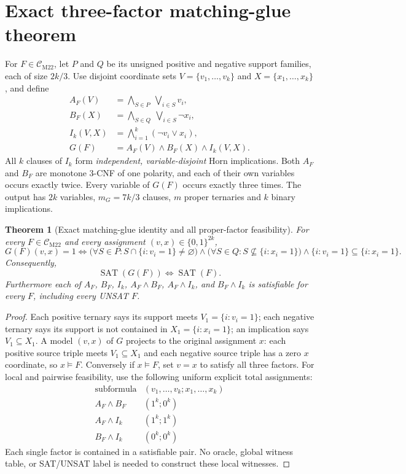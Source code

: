 \documentclass[11pt]{article}
\newtheorem{theorem}{Theorem}
\newcommand{\CM}{\mathcal C_{\mathrm{M22}}}
\newcommand{\SAT}{\operatorname{SAT}}
\begin{document}
\section{Exact three-factor matching-glue theorem}
For $F\in\CM$, let $P$ and $Q$ be its unsigned positive and negative support families, each of size $2k/3$. Use disjoint coordinate sets $V=\{v_1,\ldots,v_k\}$ and $X=\{x_1,\ldots,x_k\}$, and define
\[
\begin{aligned}
A_F(V)&=\bigwedge_{S\in P}\ \bigvee_{i\in S}v_i,\\
B_F(X)&=\bigwedge_{S\in Q}\ \bigvee_{i\in S}\neg x_i,\\
I_k(V,X)&=\bigwedge_{i=1}^k(\neg v_i\vee x_i),\\
G(F)&=A_F(V)\wedge B_F(X)\wedge I_k(V,X).
\end{aligned}
\]
All $k$ clauses of $I_k$ form \emph{independent, variable-disjoint} Horn implications. Both $A_F$ and $B_F$ are monotone 3-CNF of one polarity, and each of their own variables occurs exactly twice. Every variable of $G(F)$ occurs exactly three times. The output has $2k$ variables, $m_G=7k/3$ clauses, $m$ proper ternaries and $k$ binary implications.

\begin{theorem}[Exact matching-glue identity and all proper-factor feasibility]
For \emph{every} $F\in\CM$ and every assignment $(v,x)\in\{0,1\}^{2k}$,
\[
G(F)(v,x)=1\iff
 \bigl(\forall S\in P:S\cap\{i:v_i=1\}\ne\varnothing\bigr)
 \land
 \bigl(\forall S\in Q:S\nsubseteq\{i:x_i=1\}\bigr)
 \land
 \{i:v_i=1\}\subseteq\{i:x_i=1\}.
\]
Consequently,
\[
\boxed{\SAT(G(F))\iff\SAT(F).}
\]
Furthermore each of $A_F$, $B_F$, $I_k$, $A_F\wedge B_F$, $A_F\wedge I_k$, and $B_F\wedge I_k$ is satisfiable for \emph{every} $F$, including every UNSAT $F$.
\end{theorem}
\begin{proof}
Each positive ternary says its support meets $V_1=\{i:v_i=1\}$; each negative ternary says its support is not contained in $X_1=\{i:x_i=1\}$; an implication says $V_1\subseteq X_1$. A model $(v,x)$ of $G$ projects to the original assignment $x$: each positive source triple meets $V_1\subseteq X_1$ and each negative source triple has a zero $x$ coordinate, so $x\models F$. Conversely if $x\models F$, set $v=x$ to satisfy all three factors. For local and pairwise feasibility, use the following uniform explicit total assignments:
\[
\begin{array}{c|c}
\text{subformula}&(v_1,\ldots,v_k;x_1,\ldots,x_k)\\
\hline
A_F\wedge B_F&(1^k;0^k)\\
A_F\wedge I_k&(1^k;1^k)\\
B_F\wedge I_k&(0^k;0^k)
\end{array}
\]
Each single factor is contained in a satisfiable pair. No oracle, global witness table, or SAT/UNSAT label is needed to construct these local witnesses.
\end{proof}
\end{document}
